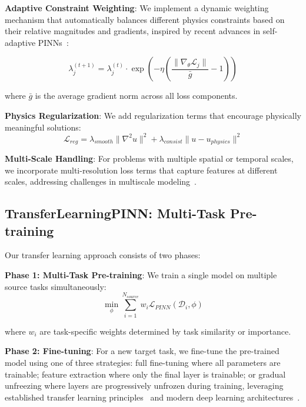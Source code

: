 \documentclass[review]{elsarticle}
\begin{document}
\textbf{Adaptive Constraint Weighting}: We implement a dynamic weighting mechanism that automatically balances different physics constraints based on their relative magnitudes and gradients, inspired by recent advances in self-adaptive PINNs~\cite{mcclenny2023self}:

\begin{equation}
\lambda_j^{(t+1)} = \lambda_j^{(t)} \cdot \exp\left(-\eta \left(\frac{\|\nabla_{\theta} \mathcal{L}_j\|}{\bar{g}} - 1\right)\right)
\end{equation}

where $\bar{g}$ is the average gradient norm across all loss components.

\textbf{Physics Regularization}: We add regularization terms that encourage physically meaningful solutions:
\begin{equation}
\mathcal{L}_{reg} = \lambda_{smooth} \|\nabla^2 u\|^2 + \lambda_{consist} \|u - u_{physics}\|^2
\end{equation}

\textbf{Multi-Scale Handling}: For problems with multiple spatial or temporal scales, we incorporate multi-resolution loss terms that capture features at different scales, addressing challenges in multiscale modeling~\cite{weinan2011principles,kevrekidis2003equation}.

\subsection{TransferLearningPINN: Multi-Task Pre-training}

Our transfer learning approach consists of two phases:

\textbf{Phase 1: Multi-Task Pre-training}: We train a single model on multiple source tasks simultaneously:
\begin{equation}
\min_\phi \sum_{i=1}^{N_{source}} w_i \mathcal{L}_{PINN}(\mathcal{D}_i, \phi)
\end{equation}

where $w_i$ are task-specific weights determined by task similarity or importance.

\textbf{Phase 2: Fine-tuning}: For a new target task, we fine-tune the pre-trained model using one of three strategies: full fine-tuning where all parameters are trainable; feature extraction where only the final layer is trainable; or gradual unfreezing where layers are progressively unfrozen during training, leveraging established transfer learning principles~\cite{pan2009survey} and modern deep learning architectures~\cite{he2016deep,lecun2015deep}.
\end{document}
